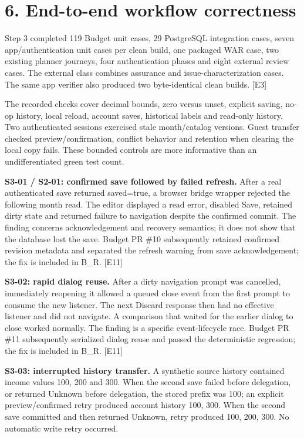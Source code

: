 \documentclass[11pt,a4paper]{article}
\begin{document}
\section*{6. End-to-end workflow correctness}

Step 3 completed 119 Budget unit cases, 29 PostgreSQL integration cases, seven app/\allowbreak{}authentication unit cases per clean build, one packaged WAR case, two existing planner journeys, four authentication phases and eight external review cases. The external class combines assurance and issue-characterization cases. The same app verifier also produced two byte-identical clean builds. [E3]

The recorded checks cover decimal bounds, zero versus unset, explicit saving, no-op history, local reload, account saves, historical labels and read-only history. Two authenticated sessions exercised stale month/\allowbreak{}catalog versions. Guest transfer checked preview/\allowbreak{}confirmation, conflict behavior and retention when clearing the local copy fails. These bounded controls are more informative than an undifferentiated green test count.

\textbf{S3-01 /\allowbreak{} S2-01: confirmed save followed by failed refresh.} After a real authenticated save returned saved=true, a browser bridge wrapper rejected the following month read. The editor displayed a read error, disabled Save, retained dirty state and returned failure to navigation despite the confirmed commit. The finding concerns acknowledgement and recovery semantics; it does not show that the database lost the save. Budget PR \#10 subsequently retained confirmed revision metadata and separated the refresh warning from save acknowledgement; the fix is included in B\_R. [E11]

\textbf{S3-02: rapid dialog reuse.} After a dirty navigation prompt was cancelled, immediately reopening it allowed a queued close event from the first prompt to consume the new listener. The next Discard response then had no effective listener and did not navigate. A comparison that waited for the earlier dialog to close worked normally. The finding is a specific event-lifecycle race. Budget PR \#11 subsequently serialized dialog reuse and passed the deterministic regression; the fix is included in B\_R. [E11]

\textbf{S3-03: interrupted history transfer.} A synthetic source history contained income values 100, 200 and 300. When the second save failed before delegation, or returned Unknown before delegation, the stored prefix was 100; an explicit preview/\allowbreak{}confirmed retry produced account history 100, 300. When the second save committed and then returned Unknown, retry produced 100, 200, 300. No automatic write retry occurred.
\end{document}
